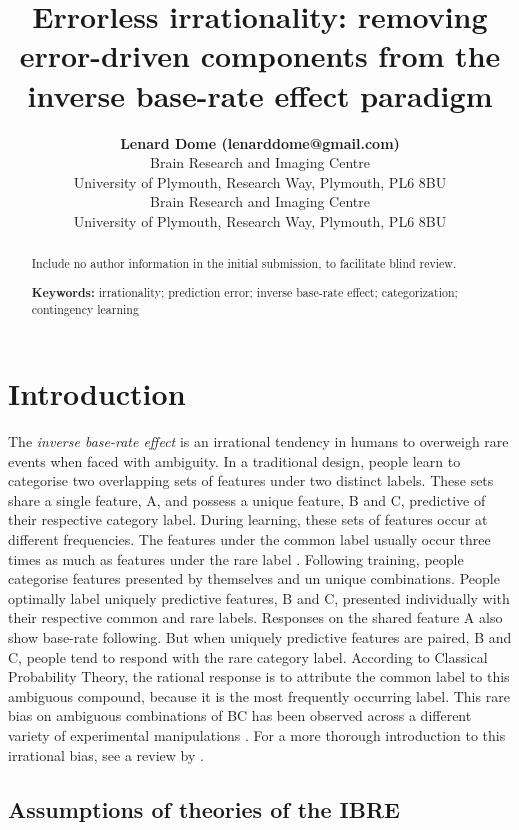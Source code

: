 \documentclass[10pt,letterpaper]{article}
\title{Errorless irrationality: removing error-driven components from the inverse base-rate effect paradigm}
\author{{\large \bf Lenard Dome (lenarddome@gmail.com)} \\
  Brain Research and Imaging Centre \\
  University of Plymouth, Research Way, Plymouth, PL6 8BU
  \AND {\large \bf Andy J. Wills (andy.wills@plymouth.ac.uk)} \\
  Brain Research and Imaging Centre \\
  University of Plymouth, Research Way, Plymouth, PL6 8BU}
\begin{document}
\maketitle

\begin{abstract}
Include no author information in the initial submission, to facilitate
blind review.

\textbf{Keywords:} 
irrationality; prediction error; inverse base-rate effect; categorization; contingency learning
\end{abstract}


\section{Introduction}

The \textit{inverse base-rate effect} \cite<IBRE, >{medin1988problem} is an irrational tendency in humans to overweigh rare events when faced with ambiguity.
In a traditional design, people learn to categorise two overlapping sets of features under two distinct labels.
These sets share a single feature, A, and possess a unique feature, B and C, predictive of their respective category label.
During learning, these sets of features occur at different frequencies.
The features under the common label usually occur three times as much as features under the rare label \cite{kruschke1996base}.
Following training, people categorise features presented by themselves and un unique combinations.
People optimally label uniquely predictive features, B and C, presented individually with their respective common and rare labels.
Responses on the shared feature A also show base-rate following.
But when uniquely predictive features are paired, B and C, people tend to respond with the rare category label.
According to Classical Probability Theory, the rational response is to attribute the common label to this ambiguous compound, because it is the most frequently occurring label.
This rare bias on ambiguous combinations of BC has been observed across a different variety of experimental manipulations \cite{kalish2001inverse,don2017effects,don2021attention,inkster2022effect,wills2014attention}.
For a more thorough introduction to this irrational bias, see a review by .

\subsection{Assumptions of theories of the IBRE}
\end{document}
